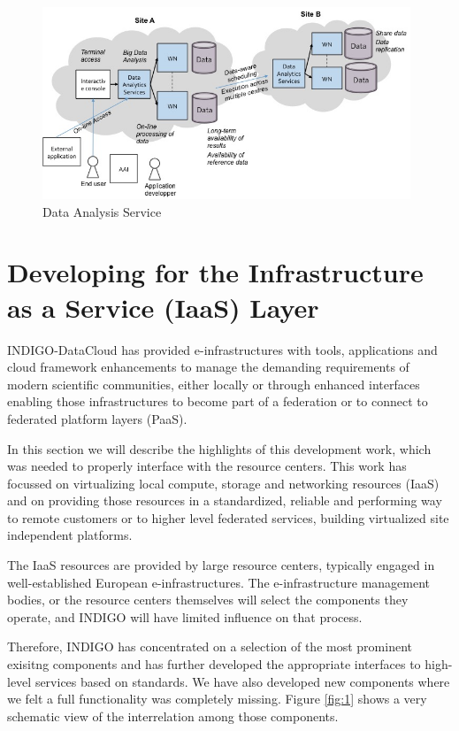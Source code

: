\documentclass{article}
\begin{document}
\begin{figure}
  \centering
  \includegraphics[width=11cm]{./figs/Figure02.jpg}
  \caption{Data Analysis Service}
  \label{fig:02}
\end{figure}



\section{Developing for the Infrastructure as a Service (IaaS) Layer}
\label{sec:iaas}

INDIGO-DataCloud  has  provided  e-infrastructures  with  tools, applications and cloud framework enhancements to manage the demanding requirements of modern scientific   communities,   either   locally   or through enhanced  interfaces enabling those infrastructures  to  become  part  of  a  federation  or to connect  to  federated  platform  layers (PaaS). 

In this section we will describe the highlights of this development work, which was needed to properly interface with the resource centers. This work has focussed on virtualizing local compute, storage and networking resources (IaaS) and on providing those resources in a standardized, reliable and performing way to remote customers or to higher level federated services, building virtualized site independent platforms.

The IaaS resources are provided by large resource centers, typically engaged in well-established European e-infrastructures. The e-infrastructure management bodies, or the resource centers themselves will select the components they operate, and INDIGO will have limited influence on that process. 

Therefore, INDIGO has concentrated on a selection of the most prominent exisitng components and has further developed the appropriate interfaces to high-level services based on standards. We have also developed new components where we felt a full functionality was completely missing. Figure \ref{fig:1} shows a very schematic view of the interrelation among those components.
\end{document}
